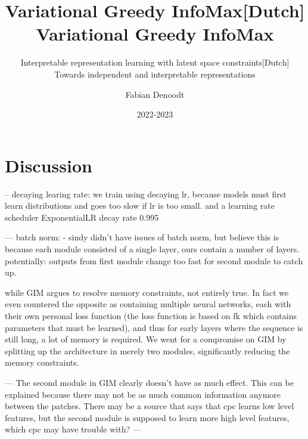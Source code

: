\documentclass[]{book}
\title{Variational Greedy InfoMax}
\subtitle{Interpretable representation learning with latent space constraints}
\author{Fabian Denoodt}
\date{2022-2023}
\begin{document}
\maketitle
\title{[Dutch] Variational Greedy InfoMax}
\subtitle{[Dutch] Towards independent and interpretable representations}
\maketitle

\tableofcontents










\chapter{Discussion}

-- 
decaying learing rate:
	we train using decaying lr, because models must first learn distributions and goes too slow if lr is too small.
	and a learning rate scheduler
	ExponentialLR
	decay rate 0.995

---
batch norm:
 - sindy didn't have issues of batch norm, but believe this is because each module consisted of a single layer, ours contain a number of layers. potentially: outputs from first module change too fast for second module to catch up.




while GIM argues to resolve memory constraints, not entirely true. In fact we even countered the opposite as containing multiple neural networks, each with their own personal loss function (the loss function is based on fk which contains parameters that must be learned), and thus for early layers where the sequence is still long, a lot of memory is required. We went for a compromise on GIM by splitting up the architecture in merely two modules, significantly reducing the memory constraints.


---
The second module in GIM clearly doesn't have as much effect. This can be explained because there may not be as much common information anymore between the patches. There may be a source that says that cpc learns low level features, but the second module is supposed to learn more high level features, which cpc may have trouble with?
---
\end{document}
